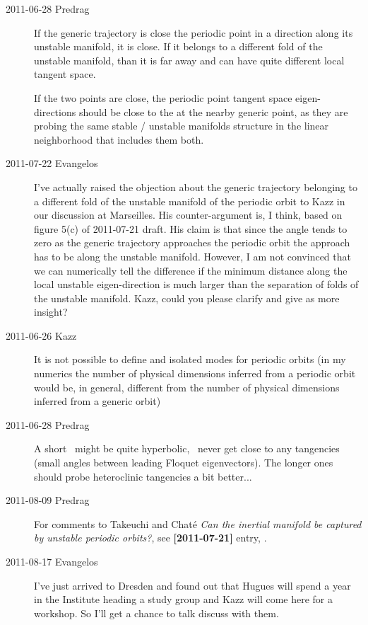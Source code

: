 \begin{description}
\item[2011-06-28 Predrag]
  If the generic trajectory is close the periodic point in a direction
  along its unstable manifold, it is close. If it belongs to a different fold of the
  unstable manifold, than it is far away and can have quite different local
  tangent space.

  If the two points are close, the periodic point tangent space
  eigen-directions should be close to the {\cLvs} at the nearby generic
  point, as they are probing the same stable / unstable manifolds structure in the
  linear neighborhood that includes them both.

\item[2011-07-22 Evangelos]
  I've actually raised the objection about the generic trajectory belonging to a
  different fold of the unstable manifold of the periodic orbit to Kazz in our
  discussion at Marseilles. His
  counter-argument is, I think, based on figure 5(c) of 2011-07-21 draft. His
  claim is that since the angle tends to zero as the generic trajectory approaches
  the periodic orbit the approach has to be along the unstable manifold.
  However, I am not convinced that we can numerically tell the difference
  if the minimum distance along the local unstable
  eigen-direction is much larger than the separation of folds of the unstable
  manifold. Kazz, could you please clarify and give as more insight?

\item[2011-06-26 Kazz] It is not possible to
  define {\entangled} and isolated modes for periodic orbits (in my numerics
  the number of physical dimensions inferred from a periodic orbit would
  be, in general, different from the number of physical dimensions inferred
  from a generic orbit)

\item[2011-06-28 Predrag]
  A short \po\ might be quite hyperbolic, \ie\ never get close to any
  tangencies (small angles between leading Floquet eigenvectors). The longer ones
  should probe heteroclinic tangencies a bit better...

\item[2011-08-09 Predrag] For comments to Takeuchi and Chat\'e
  \emph{Can the inertial manifold be captured by unstable periodic
    orbits?}, see {\bf [2011-07-21]} entry, .

\item[2011-08-17 Evangelos]
  I've just arrived to Dresden and found out that Hugues will
  spend a year in the Institute heading a study group and Kazz will come
  here for a workshop. So I'll get a chance to talk discuss with them.


\end{description}
